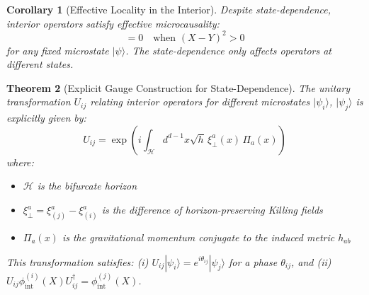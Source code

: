 \documentclass[12pt,a4paper]{article}
\newtheorem{theorem}{Theorem}[section]
\newtheorem{corollary}[theorem]{Corollary}
\begin{document}
\begin{corollary}[Effective Locality in the Interior]
Despite state-dependence, interior operators satisfy effective microcausality:
\begin{equation}
[\phi_{\text{int}}^{|\psi\rangle}(X), \phi_{\text{int}}^{|\psi\rangle}(Y)] = 0 \quad \text{when } (X-Y)^2 > 0
\end{equation}
for any fixed microstate $|\psi\rangle$. The state-dependence only affects operators at \emph{different} states.
\end{corollary}

\begin{theorem}[Explicit Gauge Construction for State-Dependence]\label{thm:explicit-gauge}
The unitary transformation $U_{ij}$ relating interior operators for different microstates $|\psi_i\rangle$, $|\psi_j\rangle$ is explicitly given by:
\begin{equation}
U_{ij} = \exp\left( i \int_{\mathcal{H}} d^{d-1}x \sqrt{h} \, \xi^a_{\perp}(x) \, \Pi_a(x) \right)
\end{equation}
where:
\begin{itemize}
    \item $\mathcal{H}$ is the bifurcate horizon
    \item $\xi^a_\perp = \xi^a_{(j)} - \xi^a_{(i)}$ is the difference of horizon-preserving Killing fields
    \item $\Pi_a(x)$ is the gravitational momentum conjugate to the induced metric $h_{ab}$
\end{itemize}
This transformation satisfies: (i) $U_{ij}|\psi_i\rangle = e^{i\theta_{ij}}|\psi_j\rangle$ for a phase $\theta_{ij}$, and (ii) $U_{ij}\phi^{(i)}_{\text{int}}(X)U_{ij}^\dagger = \phi^{(j)}_{\text{int}}(X)$.
\end{theorem}
\end{document}
